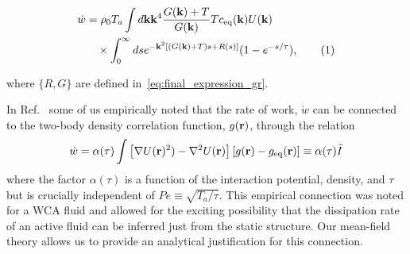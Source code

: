 \documentclass[superscriptaddress, twocolumn, prl, longbibliography, nofootinbib]{revtex4-1}
\newcommand\numberthis{\addtocounter{equation}{1}\tag{\theequation}}
\begin{document}
\begin{align*}\label{eq:final_expression_wdot}
    \dot{w} &= \rho_0 T_a \int d{\bf k} {\bf k}^4 \dfrac{G({\bf k}) + T}{G({\bf k})} T c_{\rm eq}({\bf k}) U({\bf k})
    \\
    &\quad\times \int_0^\infty ds e^{-{\bf k}^2 [ ( G({\bf k}) + T)s + R(s)]} (1-e^{-s/\tau}) ,
    \numberthis
\end{align*}

where $\{R,G\}$ are defined in~\eqref{eq:final_expression_gr}.

In Ref.~\cite{Suri2019} some of us empirically noted that the rate of work, $\dot{w}$ can be connected to the two-body density correlation function, $g(\bf r)$, through the relation
\begin{equation}
\label{eq:Idef}
    \dot{w}=\alpha (\tau) \int \left[\nabla U({\bf r})^2)-\nabla^2 U({\bf r})\right][g({\bf r})-g_{\rm eq}({\bf r})]\equiv \alpha (\tau) \tilde I
\end{equation}
where the factor $\alpha(\tau)$ is a function of the interaction potential, density, and $\tau$ but is crucially independent of $Pe\equiv \sqrt{T_a/\tau}$. This empirical connection was noted for a WCA fluid and allowed for the exciting possibility that the dissipation rate of an active fluid can be inferred just from the static structure. Our mean-field theory allows us to provide an analytical justification for this connection. 
\end{document}
